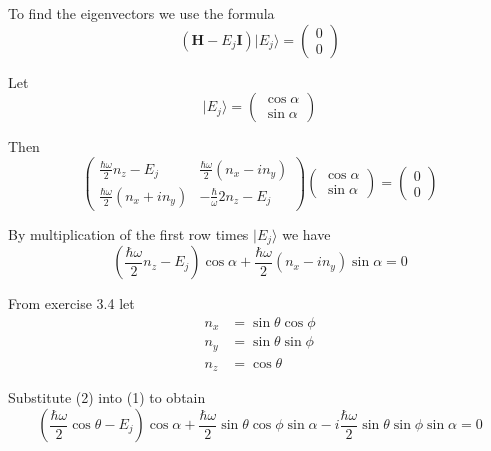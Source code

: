 \documentclass[12pt]{article}
\begin{document}
To find the eigenvectors we use the formula
\begin{equation*}
(\mathbf H-E_j\mathbf I)|E_j\rangle=\begin{pmatrix}0\\0\end{pmatrix}
\end{equation*}

Let
\begin{equation*}
|E_j\rangle=\begin{pmatrix}\cos\alpha\\\sin\alpha\end{pmatrix}
\end{equation*}

Then
\begin{equation*}
\begin{pmatrix}
\frac{\hbar\omega}{2}n_z-E_j & \frac{\hbar\omega}{2}(n_x-in_y)
\\[1ex]
\frac{\hbar\omega}{2}(n_x+in_y) & -\frac{\hbar}{\omega}{2}n_z-E_j
\end{pmatrix}
\begin{pmatrix}\cos\alpha\\\sin\alpha\end{pmatrix}=\begin{pmatrix}0\\0\end{pmatrix}
\end{equation*}

By multiplication of the first row times $|E_j\rangle$ we have
\begin{equation*}
\left(\frac{\hbar\omega}{2}n_z-E_j\right)\cos\alpha+\frac{\hbar\omega}{2}(n_x-in_y)\sin\alpha=0
\tag{1}
\end{equation*}

From exercise 3.4 let
\begin{equation*}
\begin{aligned}
n_x&=\sin\theta\cos\phi
\\
n_y&=\sin\theta\sin\phi
\\
n_z&=\cos\theta
\end{aligned}
\tag{2}
\end{equation*}

Substitute (2) into (1) to obtain
\begin{equation*}
\left(\frac{\hbar\omega}{2}\cos\theta-E_j\right)\cos\alpha
+\frac{\hbar\omega}{2}\sin\theta\cos\phi\sin\alpha
-i\frac{\hbar\omega}{2}\sin\theta\sin\phi\sin\alpha=0
\end{equation*}
\end{document}
